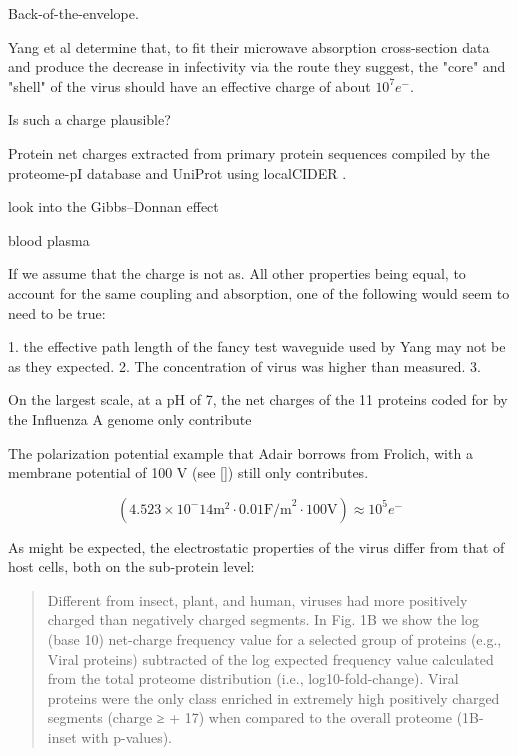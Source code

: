 \documentclass[paper.tex]{subfiles}
\begin{document}
Back-of-the-envelope.

Yang et al determine that, to fit their microwave absorption cross-section data and produce the decrease in infectivity via the route they suggest, the "core" and "shell" of the virus should have an effective charge of about $10^7 e^-$. 

Is such a charge plausible?

Protein net charges extracted from primary protein sequences compiled by the proteome-pI database \cite{ProteomepI2017} and UniProt using localCIDER \cite{CIDER2017} . 


look into the Gibbs–Donnan effect



blood plasma


If we assume that the charge is not as. All other properties being equal, to account for the same coupling and absorption, one of the following would seem to need to be true:

1. the effective path length of the fancy test waveguide used by Yang may not be as they expected.
2. The concentration of virus was higher than measured.
3. 




On the largest scale, at a pH of 7, the net charges of the 11 proteins coded for by the Influenza A genome only contribute 


The polarization potential example that Adair borrows from Frolich, with a membrane potential of 100 V (see []) still only contributes.  

$$(4.523 \times 10^-14 \text{m}^2 \cdot 0.01 \text{F/m}^2 \cdot 100 \text{V}) \approx 10^5 e^- $$




As might be expected, the electrostatic properties of the virus differ from that of host cells, both \cite{Icosahedral2019} on the sub-protein level:

\begin{quote}
	Different from insect, plant, and human, viruses had more positively charged than negatively charged segments. In Fig. 1B we show the log (base 10) net-charge frequency value for a selected group of proteins (e.g., Viral proteins) subtracted of the log expected frequency value calculated from the total proteome distribution (i.e., log10-fold-change). Viral proteins were the only class enriched in extremely high positively charged segments (charge ≥ + 17) when compared to the overall proteome (1B-inset with p-values).
\end{quote}
\end{document}
